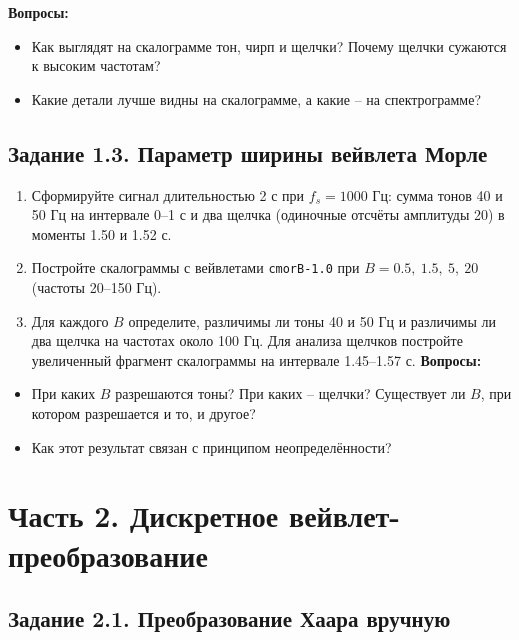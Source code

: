 \documentclass[12pt,a4paper,openany]{book}
\providecommand{\tightlist}{\setlength{\itemsep}{0pt}\setlength{\parskip}{0pt}}
\begin{document}
\textbf{Вопросы:}

\begin{itemize}
\tightlist
\item
  Как выглядят на скалограмме тон, чирп и щелчки? Почему щелчки сужаются к высоким частотам?
\item
  Какие детали лучше видны на скалограмме, а какие -- на спектрограмме?
\end{itemize}

\subsection*{Задание 1.3. Параметр ширины вейвлета Морле}

\begin{enumerate}
\def\labelenumi{\arabic{enumi}.}
\tightlist
\item
  Сформируйте сигнал длительностью 2 с при \(f_s = 1000\) Гц: сумма тонов 40 и 50 Гц на интервале 0--1 с и два щелчка (одиночные отсчёты амплитуды 20) в моменты 1.50 и 1.52 с.
\item
  Постройте скалограммы с вейвлетами \texttt{\textquotesingle{}\allowbreak{}cmorB-1.\allowbreak{}0\textquotesingle{}\allowbreak{}} при \(B = 0.5,\ 1.5,\ 5,\ 20\) (частоты 20--150 Гц).
\item
  Для каждого \(B\) определите, различимы ли тоны 40 и 50 Гц и различимы ли два щелчка на частотах около 100 Гц. Для анализа щелчков постройте увеличенный фрагмент скалограммы на интервале 1.45--1.57 с.
  \textbf{Вопросы:}
\end{enumerate}

\begin{itemize}
\tightlist
\item
  При каких \(B\) разрешаются тоны? При каких -- щелчки? Существует ли \(B\), при котором разрешается и то, и другое?
\item
  Как этот результат связан с принципом неопределённости?
\end{itemize}

\section*{Часть 2. Дискретное вейвлет-преобразование}

\subsection*{Задание 2.1. Преобразование Хаара вручную}
\end{document}
